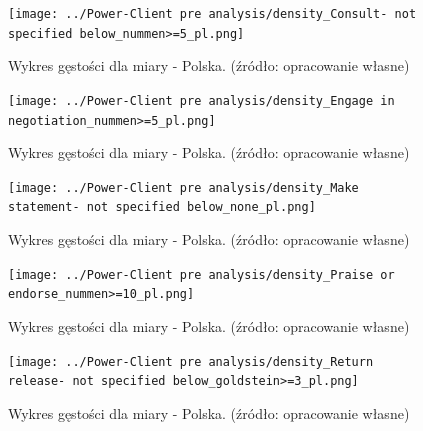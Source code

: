 \documentclass[11pt]{report}
\begin{document}
    \begin{figure}[!htp]
        \centering
        \texttt{[image: ../Power-Client pre analysis/density\_Consult- not specified below\_nummen>=5\_pl.png]}
        \caption{Wykres gęstości dla miary - Polska. (źródło: opracowanie własne)}
        \label{fig:density_Consult- not specified below_nummen>=5_pl}
    \end{figure}
    \begin{figure}[!htp]
        \centering
        \texttt{[image: ../Power-Client pre analysis/density\_Engage in negotiation\_nummen>=5\_pl.png]}
        \caption{Wykres gęstości dla miary - Polska. (źródło: opracowanie własne)}
        \label{fig:density_Engage in negotiation_nummen>=5_pl}
    \end{figure}
    \begin{figure}[!htp]
        \centering
        \texttt{[image: ../Power-Client pre analysis/density\_Make statement- not specified below\_none\_pl.png]}
        \caption{Wykres gęstości dla miary - Polska. (źródło: opracowanie własne)}
        \label{fig:density_Make statement- not specified below_none_pl}
    \end{figure}
    \begin{figure}[!htp]
        \centering
        \texttt{[image: ../Power-Client pre analysis/density\_Praise or endorse\_nummen>=10\_pl.png]}
        \caption{Wykres gęstości dla miary - Polska. (źródło: opracowanie własne)}
        \label{fig:density_Praise or endorse_nummen>=10_pl}
    \end{figure}
    \begin{figure}[!htp]
        \centering
        \texttt{[image: ../Power-Client pre analysis/density\_Return release- not specified below\_goldstein>=3\_pl.png]}
        \caption{Wykres gęstości dla miary - Polska. (źródło: opracowanie własne)}
        \label{fig:density_Return release- not specified below_goldstein>=3_pl}
    \end{figure}
\end{document}
